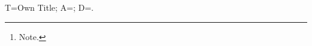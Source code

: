 \documentclass{article}
\title{\thetitle}
\author{B. Writer\thanks{Note.} \and C. Writer}
\date{2020}
\newcommand{\thetitle}{Own Title}
\begin{document}
\maketitle
T=\thetitle; A=\theauthor; D=\thedate.
\end{document}
